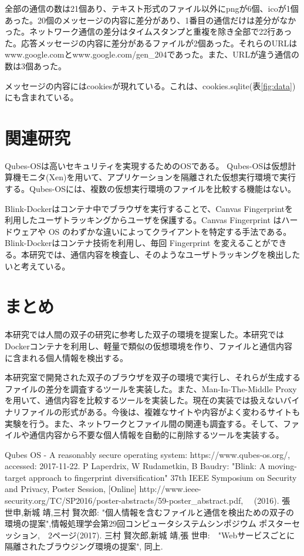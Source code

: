 \documentclass[a4paper,twocolumn,10pt]{jarticle}
\begin{document}
全部の通信の数は21個あり、テキスト形式のファイル以外にpngが6個、icoが1個あった。20個のメッセージの内容に差分があり、1番目の通信だけは差分がなかった。ネットワーク通信の差分はタイムスタンプと重複を除き全部で22行あった。応答メッセージの内容に差分があるファイルが2個あった。それらのURLはwww.google.comとwww.google.com/gen\_204であった。また、URLが違う通信の数は3個あった。

メッセージの内容にはcookiesが現れている。これは、cookies.sqlite(表\ref{fig:data})にも含まれている。



\section{関連研究}
Qubes-OS\cite{qubes}は高いセキュリティを実現するためのOSである。 Qubes-OSは仮想計算機モニタ(Xen)を用いて、アプリケーションを隔離された仮想実行環境で実行する。Qubes-OSには、複数の仮想実行環境のファイルを比較する機能はない。

Blink-Docker\cite{blink}はコンテナ中でブラウザを実行することで、Canvas Fingerprintを利用したユーザトラッキングからユーザを保護する。Canvas Fingerprint はハードウェアや OS のわずかな違いによってクライアントを特定する手法である。Blink-Dockerはコンテナ技術を利用し、毎回 Fingerprint を変えることができる。本研究では、通信内容を検査し、そのようなユーザトラッキングを検出したいと考えている。



\section{まとめ}
本研究では人間の双子の研究に参考した双子の環境を提案した。本研究ではDockerコンテナを利用し、軽量で類似の仮想環境を作り、ファイルと通信内容に含まれる個人情報を検出する。

本研究室で開発された双子のブラウザを双子の環境で実行し、それらが生成するファイルの差分を調査するツールを実装した。また、Man-In-The-Middle Proxyを用いて、通信内容を比較するツールを実装した。現在の実装では扱えないバイナリファイルの形式がある。今後は、複雑なサイトや内容がよく変わるサイトも実験を行う。また、ネットワークとファイル間の関連も調査する。そして、ファイルや通信内容から不要な個人情報を自動的に削除するツールを実装する。



\begin{thebibliography}{1}

 {\small Qubes OS - A reasonably secure operating system: https://www.qubes-os.org/, accessed: 2017-11-22.}
 P Laperdrix, W Rudametkin, B Baudry: "Blink: A moving-target approach to fingerprint diversification" 37th IEEE Symposium on Security and Privacy, Poster Session, [Online]
http://www.ieee-security.org/TC/SP2016/poster-abstracts/59-poster\_abstract.pdf, 　(2016).
張 世申,新城 靖,三村 賢次郎: "個人情報を含むファイルと通信を検出ための双子の環境の提案",情報処理学会第29回コンピュータシステムシンポジウム ポスターセッション,　2ページ(2017).
三村 賢次郎,新城 靖,張 世申:　"Webサービスごとに隔離されたブラウジング環境の提案", 同上.
\end{thebibliography}
\end{document}
